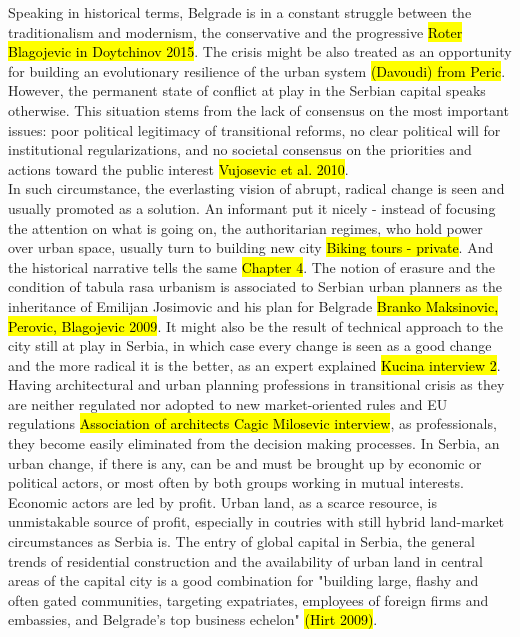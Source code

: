 \documentclass[11pt]{report}
\begin{document}
Speaking in historical terms, Belgrade is in a constant struggle between the traditionalism and modernism, the conservative and the progressive \hl{Roter Blagojevic in Doytchinov 2015}. The crisis might be also treated as an opportunity for building an evolutionary resilience of the urban system \hl{(Davoudi) from Peric}.
However, the permanent state of conflict at play in the Serbian capital speaks otherwise.
This situation stems from the lack of consensus on the most important issues: poor political legitimacy of transitional reforms, no clear political will for institutional regularizations,  and no societal consensus on the priorities and actions toward the public interest 
\hl{Vujosevic et al. 2010}.
\\
In such circumstance, the everlasting vision of abrupt, radical change is seen and usually promoted as a solution.   
An informant put it nicely - instead of focusing the attention on what is going on, the authoritarian regimes, who hold power over urban space, usually turn to building new city \hl{Biking tours - private}.
And the historical narrative tells the same \hl{Chapter 4}.
The notion of erasure and the condition of tabula rasa urbanism is associated to Serbian urban planners as the inheritance of Emilijan Josimovic and his plan for Belgrade \hl{Branko Maksinovic, Perovic, Blagojevic 2009}.
It might also be the result of technical approach to the city still at play in Serbia, in which case every change is seen as a good change and the more radical it is the better, as an expert explained
\hl{Kucina interview 2}.
\\
Having architectural and urban planning professions in transitional crisis as they are neither regulated nor adopted to new market-oriented rules and EU regulations \hl{Association of architects Cagic Milosevic interview}, as professionals, they become easily eliminated from the decision making processes.
In Serbia, an urban change, if there is any, can be and must be brought up by economic or political actors, or most often by both groups working in mutual interests.
\\
Economic actors are led by profit. Urban land, as a scarce resource, is unmistakable source of profit, especially in coutries with still hybrid land-market circumstances as Serbia is.
The entry of global capital in Serbia, the general trends of residential construction and the availability of urban land in central areas of the capital city is a good combination for  
"building large, flashy and often gated communities, targeting expatriates, employees of foreign firms and embassies, and Belgrade’s top business echelon" \hl{(Hirt 2009)}.
\end{document}
